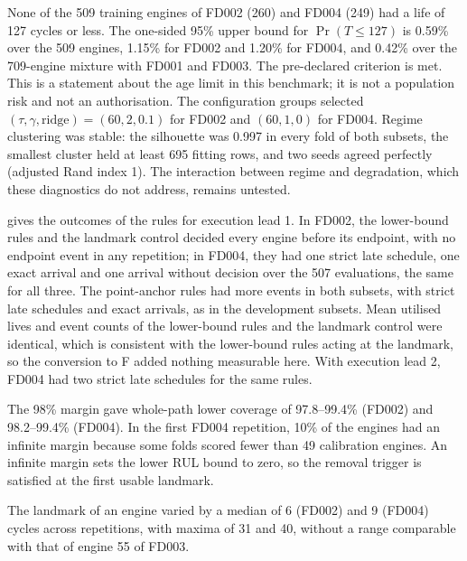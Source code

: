 \documentclass[preprint,12pt]{elsarticle}
\begin{document}
None of the 509 training engines of FD002 (260) and FD004 (249) had a life of 127 cycles or less. The one-sided 95\% upper bound for $\Pr(T\leq 127)$ is 0.59\% over the 509 engines, 1.15\% for FD002 and 1.20\% for FD004, and 0.42\% over the 709-engine mixture with FD001 and FD003. The pre-declared criterion is met. This is a statement about the age limit in this benchmark; it is not a population risk and not an authorisation. The configuration groups selected $(\tau,\gamma,\text{ridge})=(60,2,0.1)$ for FD002 and $(60,1,0)$ for FD004. Regime clustering was stable: the silhouette was 0.997 in every fold of both subsets, the smallest cluster held at least 695 fitting rows, and two seeds agreed perfectly (adjusted Rand index 1). The interaction between regime and degradation, which these diagnostics do not address, remains untested.

 gives the outcomes of the rules for execution lead 1. In FD002, the lower-bound rules and the landmark control decided every engine before its endpoint, with no endpoint event in any repetition; in FD004, they had one strict late schedule, one exact arrival and one arrival without decision over the 507 evaluations, the same for all three. The point-anchor rules had more events in both subsets, with strict late schedules and exact arrivals, as in the development subsets. Mean utilised lives and event counts of the lower-bound rules and the landmark control were identical, which is consistent with the lower-bound rules acting at the landmark, so the conversion to F added nothing measurable here. With execution lead 2, FD004 had two strict late schedules for the same rules.

The 98\% margin gave whole-path lower coverage of 97.8--99.4\% (FD002) and 98.2--99.4\% (FD004). In the first FD004 repetition, 10\% of the engines had an infinite margin because some folds scored fewer than 49 calibration engines. An infinite margin sets the lower RUL bound to zero, so the removal trigger is satisfied at the first usable landmark.

The landmark of an engine varied by a median of 6 (FD002) and 9 (FD004) cycles across repetitions, with maxima of 31 and 40, without a range comparable with that of engine 55 of FD003.
\end{document}
